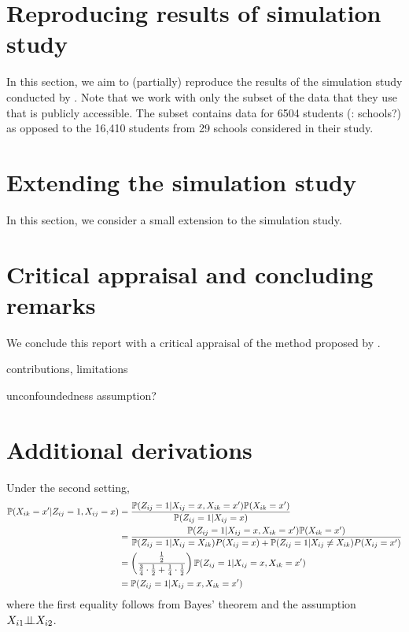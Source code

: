 \documentclass[10pt]{article}
\begin{document}
\section{Reproducing results of simulation study}

\todo In this section, we aim to (partially) reproduce the results of the simulation study conducted by \textcite{Forastiere:2021}. Note that we work with only the subset of the data that they use that is publicly accessible. The subset contains data for 6504 students (\todo: schools?) as opposed to the 16,410 students from 29 schools considered in their study.
\\


\section{Extending the simulation study}

\todo In this section, we consider a small extension to the simulation study.
\\


\section{Critical appraisal and concluding remarks}

\todo We conclude this report with a critical appraisal of the method proposed by \textcite{Forastiere:2021}.

\todo contributions, limitations

\todo unconfoundedness assumption? \textcite{Sanchez:2021}


\newpage


\begin{refcontext}[sorting=nyt]
\printbibliography
\end{refcontext}


\newpage

\appendix

\section{Additional derivations}

Under the second setting,
\begin{align*}
\P(X_{ik}=x'|Z_{ij}=1,X_{ij}=x) &= \frac{\P(Z_{ij}=1|X_{ij}=x,X_{ik}=x')\P(X_{ik}=x')}{\P(Z_{ij}=1|X_{ij}=x)} \\
&= \frac{\P(Z_{ij}=1|X_{ij}=x,X_{ik}=x')\P(X_{ik}=x')}{\P(Z_{ij}=1|X_{ij}=X_{ik})P(X_{ij}=x) + \P(Z_{ij}=1|X_{ij}\neq X_{ik})P(X_{ij}=x')} \\
&= \left(\frac{\frac{1}{2}}{\frac{3}{4}\cdot\frac{1}{2}+\frac{1}{4}\cdot\frac{1}{2}}\right)\P(Z_{ij}=1|X_{ij}=x,X_{ik}=x') \\
&= \P(Z_{ij}=1|X_{ij}=x,X_{ik}=x')
\end{align*}
where the first equality follows from Bayes' theorem and the assumption $X_{i1}\condind X_{i2}$.
\end{document}

